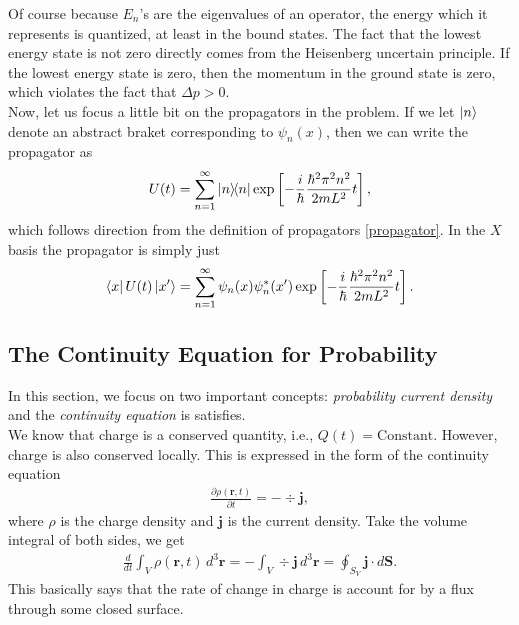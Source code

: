 \documentclass{book}
\theoremstyle{definition}
\newcommand{\p}{\partial}
\newcommand{\f}[2]{\frac{#1}{#2}}
\newcommand{\lb}{\left[}
\newcommand{\rb}{\right]}
\begin{document}
Of course because $E_n$'s are the eigenvalues of an operator, the energy which it represents is quantized, at least in the bound states. The fact that the lowest energy state is not zero directly comes from the Heisenberg uncertain principle. If the lowest energy state is zero, then the momentum in the ground state is zero, which violates the fact that $\Delta p > 0$. \\

Now, let us focus a little bit on the propagators in the problem. If we let $\ket{n}$ denote an abstract braket corresponding to $\psi_n(x)$, then we can write the propagator as
\begin{align}
U(t) = \sum^\infty_{n=1}\ketbra{n} \exp \lb -\f{i}{\hbar} \f{\hbar^2\pi^2n^2}{2mL^2} t \rb,
\end{align} 
which follows direction from the definition of propagators \eqref{propagator}. In the $X$ basis the propagator is simply just 
\begin{align}
\bra{x}U(t)\ket{x'} = \sum^\infty_{n=1}\psi_n(x)\psi_n^*(x')\exp \lb -\f{i}{\hbar}\f{\hbar^2\pi^2n^2}{2mL^2} t \rb.
\end{align}









\subsection{The Continuity Equation for Probability}



In this section, we focus on two important concepts: \textit{probability current density} and the \textit{continuity equation} is satisfies. \\

We know that charge is a conserved quantity, i.e., $Q(t) = \text{Constant}$. However, charge is also conserved locally. This is expressed in the form of the continuity equation
\begin{align}
\f{\p \rho(\mathbf{r},t)}{\p t} = -\div \mathbf{j},
\end{align}
where $\rho$ is the charge density and $\mathbf{j}$ is the current density. Take the volume integral of both sides, we get
\begin{align}
\f{d}{dt}\int_V \rho(\mathbf{r},t)\,d^3\mathbf{r} = -\int_V \div \mathbf{j}\,d^3\mathbf{r} = \oint_{S_V} \mathbf{j}\cdot d\mathbf{S}.
\end{align}
This basically says that the rate of change in charge is account for by a flux through some closed surface. \\
\end{document}
